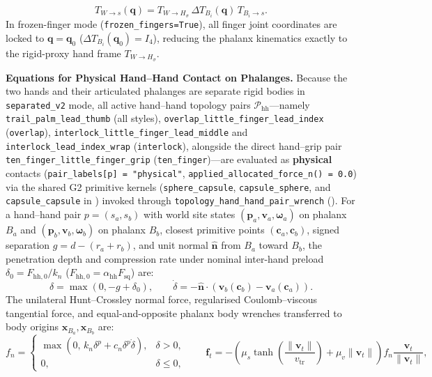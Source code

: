 \documentclass[11pt,a4paper]{article}
\begin{document}
\begin{equation}
T_{W \to s}(\mathbf{q}) = T_{W \to H_{\sigma}} \, \Delta T_{B_i}(\mathbf{q}) \, T_{B_i \to s}.
\end{equation}
In frozen-finger mode (\texttt{frozen\_fingers=True}), all finger joint coordinates are locked to $\mathbf{q} = \mathbf{q}_0$ ($\Delta T_{B_i}(\mathbf{q}_0) = I_4$), reducing the phalanx kinematics exactly to the rigid-proxy hand frame $T_{W \to H_{\sigma}}$.

\textbf{Equations for Physical Hand--Hand Contact on Phalanges.}
Because the two hands and their articulated phalanges are separate rigid bodies in \texttt{separated\_v2} mode, all active hand--hand topology pairs $\mathcal{P}_{\mathrm{hh}}$---namely \texttt{trail\_palm\_lead\_thumb} (all styles), \texttt{overlap\_little\_finger\_lead\_index} (\texttt{overlap}), \texttt{interlock\_little\_finger\_lead\_middle} and \texttt{interlock\_lead\_index\_wrap} (\texttt{interlock}), alongside the direct hand--grip pair \texttt{ten\_finger\_little\_finger\_grip} (\texttt{ten\_finger})---are evaluated as \textbf{physical} contacts (\texttt{pair\_labels[p] = "physical"}, \texttt{applied\_allocated\_force\_n() = 0.0}) via the shared G2 primitive kernels (\texttt{sphere\_capsule}, \texttt{capsule\_sphere}, and \texttt{capsule\_capsule} in ) invoked through \texttt{topology\_hand\_hand\_pair\_wrench} ().
For a hand--hand pair $p = (s_a, s_b)$ with world site states $(\mathbf{p}_a, \mathbf{v}_a, \boldsymbol{\omega}_a)$ on phalanx $B_a$ and $(\mathbf{p}_b, \mathbf{v}_b, \boldsymbol{\omega}_b)$ on phalanx $B_b$, closest primitive points $(\mathbf{c}_a, \mathbf{c}_b)$, signed separation $g = d - (r_a + r_b)$, and unit normal $\hat{\mathbf{n}}$ from $B_a$ toward $B_b$, the penetration depth and compression rate under nominal inter-hand preload $\delta_0 = F_{\mathrm{hh},0} / k_n$ ($F_{\mathrm{hh},0} = \alpha_{\mathrm{hh}} F_{\mathrm{sq}}$) are:
\begin{equation}
\delta = \max(0, -g + \delta_0), \qquad \dot{\delta} = -\hat{\mathbf{n}} \cdot (\mathbf{v}_b(\mathbf{c}_b) - \mathbf{v}_a(\mathbf{c}_a)).
\end{equation}
The unilateral Hunt--Crossley normal force, regularised Coulomb--viscous tangential force, and equal-and-opposite phalanx body wrenches transferred to body origins $\mathbf{x}_{B_a}, \mathbf{x}_{B_b}$ are:
\begin{equation}
f_n = \begin{cases} \max\!\left(0,\, k_n \delta^p + c_n \delta^p \dot{\delta}\right), & \delta > 0, \\ 0, & \delta \le 0, \end{cases}
\qquad
\mathbf{f}_t = -\left(\mu_s \tanh\!\left(\frac{\|\mathbf{v}_t\|}{v_{\mathrm{tr}}}\right) + \mu_v \|\mathbf{v}_t\|\right) f_n \frac{\mathbf{v}_t}{\|\mathbf{v}_t\|},
\end{equation}
\end{document}
